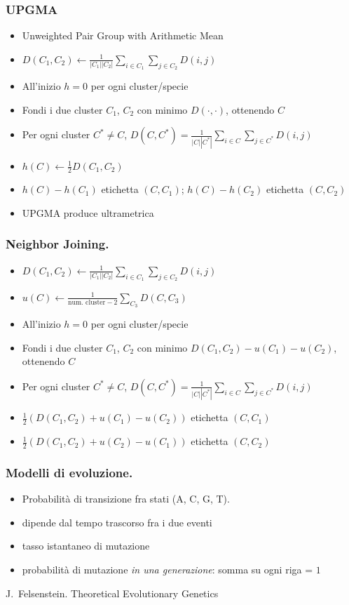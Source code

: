 \begin{frame}[fragile]
  \frametitle{UPGMA}
\begin{itemize}
\item
  Unweighted Pair Group with Arithmetic Mean
\item
  $D(C_{1}, C_{2}) \gets \frac{1}{|C_{1}||C_{2}|}\sum_{i\in C_{1}}\sum_{j\in C_{2}} D(i,j)$
\item
  All'inizio $h=0$ per ogni cluster/specie
\item
Fondi i due cluster $C_{1}$, $C_{2}$ con minimo $D(\cdot, \cdot)$, ottenendo $C$
\item
  Per ogni cluster $C^{*}\neq C$, $D(C, C^{*}) = \frac{1}{|C||C^{*}|}\sum_{i\in C}\sum_{j\in C^{*}} D(i,j)$
\item
  $h(C)\gets \frac{1}{2}D(C_{1}, C_{2})$
\item
  $h(C) - h(C_{1})$ etichetta $(C, C_{1})$; $h(C) - h(C_{2})$ etichetta $(C, C_{2})$
\item
  UPGMA produce ultrametrica
\end{itemize}
\end{frame}

\begin{frame}[fragile]
\frametitle{Neighbor Joining.}
\begin{itemize}
\item
  $D(C_{1}, C_{2}) \gets \frac{1}{|C_{1}||C_{2}|}\sum_{i\in C_{1}}\sum_{j\in C_{2}} D(i,j)$
\item
  $u(C) \gets \frac{1}{\text{num. cluster} - 2} \sum_{C_{3}} D(C,C_{3})$
\item
  All'inizio $h=0$ per ogni cluster/specie
\item
  Fondi i due cluster $C_{1}$, $C_{2}$ con minimo $D(C_{1}, C_{2}) - u(C_{1}) -u(C_{2})$, ottenendo $C$
\item
  Per ogni cluster $C^{*}\neq C$, $D(C, C^{*}) = \frac{1}{|C||C^{*}|}\sum_{i\in C}\sum_{j\in C^{*}} D(i,j)$
\item
  $\frac{1}{2}\left(D(C_{1}, C_{2}) + u(C_{1}) - u(C_{2})\right)$ etichetta $(C, C_{1})$
\item
  $\frac{1}{2}\left(D(C_{1}, C_{2}) + u(C_{2}) - u(C_{1})\right)$ etichetta $(C, C_{2})$
\end{itemize}
\end{frame}

\begin{frame}[fragile]
  \frametitle{Modelli di evoluzione.}
\begin{itemize}
\item
  Probabilità di transizione fra stati (A, C, G, T).
\item
  dipende dal tempo trascorso fra i due eventi
\item
  tasso istantaneo di mutazione
\item
  probabilità di mutazione \emph{in una generazione}: somma su ogni riga = $1$
\end{itemize}

J.~Felsenstein.
%
 Theoretical Evolutionary Genetics
\end{frame}

